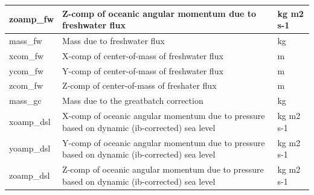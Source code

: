 \begin{longtable}{|m{}|m{}|m{}|}
zoamp\_fw &Z-comp of oceanic angular momentum due to freshwater flux &kg m2 s-1  \\ \hline
mass\_fw &Mass due to freshwater flux &kg  \\ \hline
xcom\_fw &X-comp of center-of-mass of freshwater flux &m  \\ \hline
ycom\_fw &Y-comp of center-of-mass of freshwater flux &m  \\ \hline
zcom\_fw &Z-comp of center-of-mass of freshater flux &m  \\ \hline
mass\_gc &Mass due to the greatbatch correction &kg  \\ \hline
xoamp\_dsl &X-comp of oceanic angular momentum due to pressure based on dynamic (ib-corrected) sea level &kg m2 s-1  \\ \hline
yoamp\_dsl &Y-comp of oceanic angular momentum due to pressure based on dynamic (ib-corrected) sea level &kg m2 s-1  \\ \hline
zoamp\_dsl &Z-comp of oceanic angular momentum due to pressure based on dynamic (ib-corrected) sea level &kg m2 s-1  \\ \hline
\end{longtable}

\newp
\pagebreak
